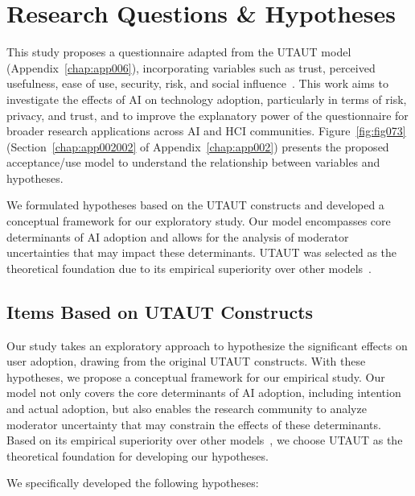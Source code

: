 \section{Research Questions \& Hypotheses}
\label{sec:chap004003}

This study proposes a questionnaire adapted from the UTAUT model (Appendix~\ref{chap:app006}), incorporating variables such as trust, perceived usefulness, ease of use, security, risk, and social influence~\cite{BOOTSMAN201999}.
This work aims to investigate the effects of \ac{AI} on technology adoption, particularly in terms of risk, privacy, and trust, and to improve the explanatory power of the questionnaire for broader research applications across \ac{AI} and \ac{HCI} communities.
Figure~\ref{fig:fig073} (Section~\ref{chap:app002002} of Appendix~\ref{chap:app002}) presents the proposed acceptance/use model to understand the relationship between variables and hypotheses.

We formulated hypotheses based on the \ac{UTAUT} constructs and developed a conceptual framework for our exploratory study.
Our model encompasses core determinants of \ac{AI} adoption and allows for the analysis of moderator uncertainties that may impact these determinants.
\ac{UTAUT} was selected as the theoretical foundation due to its empirical superiority over other models~\cite{CALISTO2022102922}.

\subsection{Items Based on UTAUT Constructs}
\label{sec:chap004003001}

Our study takes an exploratory approach to hypothesize the significant effects on user adoption, drawing from the original \ac{UTAUT} constructs.
With these hypotheses, we propose a conceptual framework for our empirical study.
Our model not only covers the core determinants of \ac{AI} adoption, including intention and actual adoption, but also enables the research community to analyze moderator uncertainty that may constrain the effects of these determinants.
Based on its empirical superiority over other models~\cite{CALISTO2022102922}, we choose \ac{UTAUT} as the theoretical foundation for developing our hypotheses.

\vspace{2.00mm}

\noindent
We specifically developed the following hypotheses:

\vspace{2.00mm}


